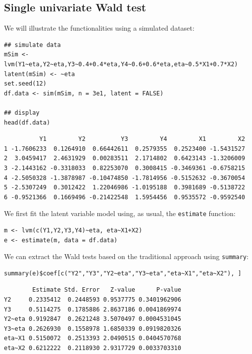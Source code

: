 \documentclass[12pt]{article}
\begin{document}
\subsection{Single univariate Wald test}
\label{sec:org00a24b1}

We will illustrate the functionalities using a simulated dataset:
\lstset{language=r,label= ,caption= ,captionpos=b,numbers=none}
\begin{lstlisting}
## simulate data
mSim <- lvm(Y1~eta,Y2~eta,Y3~0.4+0.4*eta,Y4~0.6+0.6*eta,eta~0.5*X1+0.7*X2)
latent(mSim) <- ~eta
set.seed(12)
df.data <- sim(mSim, n = 3e1, latent = FALSE)

## display
head(df.data)
\end{lstlisting}

\begin{verbatim}
          Y1         Y2          Y3         Y4         X1         X2
1 -1.7606233  0.1264910  0.66442611  0.2579355  0.2523400 -1.5431527
2  3.0459417  2.4631929  0.00283511  2.1714802  0.6423143 -1.3206009
3 -2.1443162 -0.3318033  0.82253070  0.3008415 -0.3469361 -0.6758215
4 -2.5050328 -1.3878987 -0.10474850 -1.7814956 -0.5152632 -0.3670054
5 -2.5307249  0.3012422  1.22046986 -1.0195188  0.3981689 -0.5138722
6 -0.9521366  0.1669496 -0.21422548  1.5954456  0.9535572 -0.9592540
\end{verbatim}


We first fit the latent variable model using, as usual, the \texttt{estimate}
function:
\lstset{language=r,label= ,caption= ,captionpos=b,numbers=none}
\begin{lstlisting}
m <- lvm(c(Y1,Y2,Y3,Y4)~eta, eta~X1+X2)
e <- estimate(m, data = df.data)
\end{lstlisting}

We can extract the Wald tests based on the traditional approach using
\texttt{summary}:
\lstset{language=r,label= ,caption= ,captionpos=b,numbers=none}
\begin{lstlisting}
summary(e)$coef[c("Y2","Y3","Y2~eta","Y3~eta","eta~X1","eta~X2"), ]
\end{lstlisting}

\begin{verbatim}
        Estimate Std. Error   Z-value      P-value
Y2     0.2335412  0.2448593 0.9537775 0.3401962906
Y3     0.5114275  0.1785886 2.8637186 0.0041869974
Y2~eta 0.9192847  0.2621248 3.5070497 0.0004531045
Y3~eta 0.2626930  0.1558978 1.6850339 0.0919820326
eta~X1 0.5150072  0.2513393 2.0490515 0.0404570768
eta~X2 0.6212222  0.2118930 2.9317729 0.0033703310
\end{verbatim}
\end{document}
